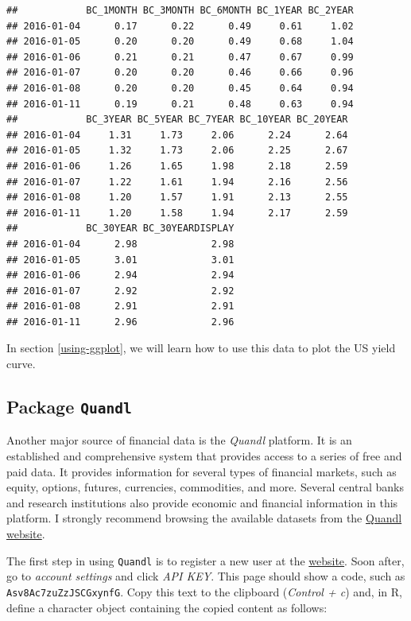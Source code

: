 \documentclass[11pt,]{book}
\begin{document}
\begin{verbatim}
##            BC_1MONTH BC_3MONTH BC_6MONTH BC_1YEAR BC_2YEAR
## 2016-01-04      0.17      0.22      0.49     0.61     1.02
## 2016-01-05      0.20      0.20      0.49     0.68     1.04
## 2016-01-06      0.21      0.21      0.47     0.67     0.99
## 2016-01-07      0.20      0.20      0.46     0.66     0.96
## 2016-01-08      0.20      0.20      0.45     0.64     0.94
## 2016-01-11      0.19      0.21      0.48     0.63     0.94
##            BC_3YEAR BC_5YEAR BC_7YEAR BC_10YEAR BC_20YEAR
## 2016-01-04     1.31     1.73     2.06      2.24      2.64
## 2016-01-05     1.32     1.73     2.06      2.25      2.67
## 2016-01-06     1.26     1.65     1.98      2.18      2.59
## 2016-01-07     1.22     1.61     1.94      2.16      2.56
## 2016-01-08     1.20     1.57     1.91      2.13      2.55
## 2016-01-11     1.20     1.58     1.94      2.17      2.59
##            BC_30YEAR BC_30YEARDISPLAY
## 2016-01-04      2.98             2.98
## 2016-01-05      3.01             3.01
## 2016-01-06      2.94             2.94
## 2016-01-07      2.92             2.92
## 2016-01-08      2.91             2.91
## 2016-01-11      2.96             2.96
\end{verbatim}

In section \ref{using-ggplot}, we will learn how to use this data to
plot the US yield curve.

\subsection{\texorpdfstring{Package
\texttt{Quandl}}{Package Quandl}}\label{quandl}

Another major source of financial data is the \emph{Quandl} platform. It
is an established and comprehensive system that provides access to a
series of free and paid data. It provides information for several types
of financial markets, such as equity, options, futures, currencies,
commodities, and more. Several central banks and research institutions
also provide economic and financial information in this platform. I
strongly recommend browsing the available datasets from the
\href{https://www.quandl.com/}{Quandl website}. 

The first step in using \texttt{Quandl} is to register a new user at the
\href{https://www.quandl.com/}{website}. Soon after, go to \emph{account
settings} and click \emph{API KEY}. This page should show a code, such
as \texttt{Asv8Ac7zuZzJSCGxynfG}. Copy this text to the clipboard
(\emph{Control + c}) and, in R, define a character object containing the
copied content as follows:
\end{document}
